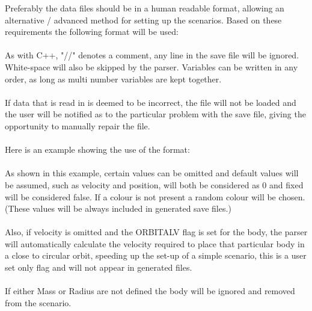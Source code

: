 Preferably the data files should be in a human readable format, allowing an alternative / advanced method for setting up the scenarios. Based on these requirements the following format will be used:
\texttt{} 

\paragraph{}
As with C++, "//" denotes a comment, any line in the save file will be ignored. White-space will also be skipped by the parser. Variables can be written in any order, as long as multi number variables are kept together.

\paragraph{}
If data that is read in is deemed to be incorrect, the file will not be loaded and the user will be notified as to the particular problem with the save file, giving the opportunity to manually repair the file.

\paragraph{}
Here is an example showing the use of the format:
\texttt{} 

\paragraph{}
As shown in this example, certain values can be omitted and default values will be assumed, such as velocity and position, will both be considered as 0 and fixed will be considered false. If a colour is not present a random colour will be chosen. (These values will be always included in generated save files.)

\paragraph{}
Also, if velocity is omitted and the ORBITALV flag is set for the body, the parser will automatically calculate the velocity required to place that particular body in a close to circular orbit, speeding up the set-up of a simple scenario, this is a user set only flag and will not appear in generated files.

\paragraph{}
If either Mass or Radius are not defined the body will be ignored and removed from the scenario.

